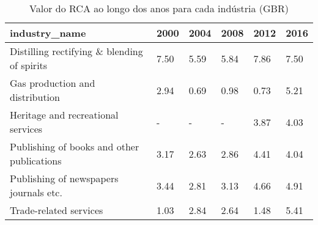 \begin{table}
\centering
\caption{Valor do RCA ao longo dos anos para cada indústria (GBR)}
\begin{tabular}{p{6cm}p{1.5cm}p{1.5cm}p{1.5cm}p{1.5cm}p{1.5cm}}
\toprule
                              industry\_name & 2000 & 2004 & 2008 & 2012 & 2016 \\
\midrule
Distilling rectifying \& blending of spirits & 7.50 & 5.59 & 5.84 & 7.86 & 7.50 \\
            Gas production and distribution & 2.94 & 0.69 & 0.98 & 0.73 & 5.21 \\
         Heritage and recreational services &    - &    - &    - & 3.87 & 4.03 \\
 Publishing of books and other publications & 3.17 & 2.63 & 2.86 & 4.41 & 4.04 \\
     Publishing of newspapers journals etc. & 3.44 & 2.81 & 3.13 & 4.66 & 4.91 \\
                     Trade-related services & 1.03 & 2.84 & 2.64 & 1.48 & 5.41 \\
\bottomrule
\end{tabular}
\end{table}
